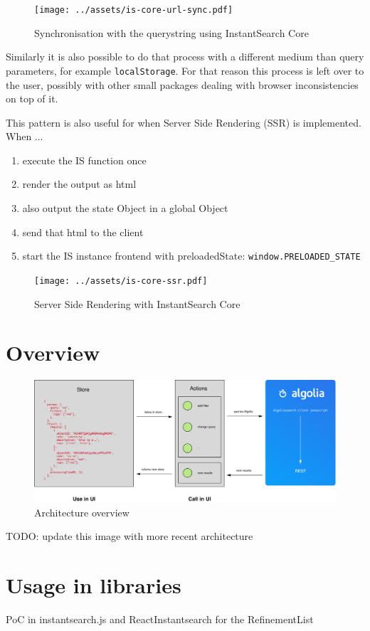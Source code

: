 \begin{figure}[H]
  \centering
  \texttt{[image: ../assets/is-core-url-sync.pdf]}
  \caption{Synchronisation with the querystring using InstantSearch Core}
  \label{figure:is-core-url-sync}
\end{figure} %

Similarly it is also possible to do that process with a different medium than query parameters, for example {\tt localStorage}. For that reason this process is left over to the user, possibly with other small packages dealing with browser inconsistencies on top of it. 

This pattern is also useful for when Server Side Rendering (SSR) is implemented. When ...%

\begin{enumerate}
  \item execute the IS function once
  \item render the output as html
  \item also output the state Object in a global Object
  \item send that html to the client
  \item start the IS instance frontend with preloadedState: {\tt window.PRELOADED\_STATE} %
\end{enumerate}

\begin{figure}[H]
  \centering
  \texttt{[image: ../assets/is-core-ssr.pdf]}
  \caption{Server Side Rendering with InstantSearch Core}
  \label{figure:is-core-ssr}
\end{figure} %


\section{Overview} %
\label{sec:overview}

\begin{figure}[H]
  \centering
  \includegraphics[width=\textwidth]{../assets/architecture.pdf}
  \caption{Architecture overview\cite{blog-architecture}}
  \label{figure:core-architecture}
\end{figure}

TODO: update this image with more recent architecture %


\section{Usage in libraries} %
\label{sec:usage_in_libraries}

PoC in instantsearch.js and ReactInstantsearch for the RefinementList %


